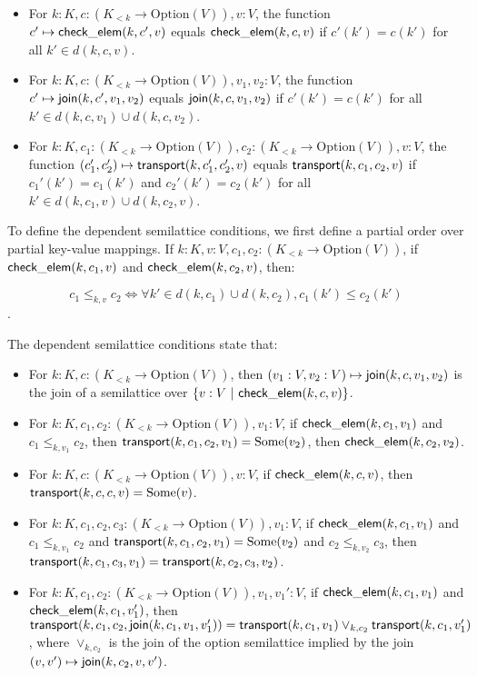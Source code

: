\documentclass{article}
\begin{document}
      \begin{itemize}
        \item For $k : K, c : (K_{<k} \to \mathrm{Option}(V)), v : V$, the function $c' \mapsto \mathsf{check\_elem}(k, c', v)$ equals $\mathsf{check\_elem}(k, c, v)$ if $c'(k') = c(k')$ for all $k' \in d(k, c, v)$.
        \item For $k : K, c : (K_{<k} \to \mathrm{Option}(V)), v_1, v_2 : V$, the function $c' \mapsto \mathsf{join}(k, c', v_1, v_2)$ equals $\mathsf{join}(k, c, v_1, v_2)$ if $c'(k') = c(k')$ for all $k' \in d(k, c, v_1) \cup d(k, c, v_2)$.
        \item For $k : K, c_1 : (K_{<k} \to \mathrm{Option}(V)), c_2 : (K_{<k} \to \mathrm{Option}(V)), v : V$, the function $(c_1', c_2') \mapsto \mathsf{transport}(k, c_1', c_2', v)$ equals $\mathsf{transport}(k, c_1, c_2, v)$ if $c_1'(k') = c_1(k')$ and $c_2'(k') = c_2(k')$ for all $k' \in d(k, c_1, v) \cup d(k, c_2, v)$.
      \end{itemize}

      To define the dependent semilattice conditions, we first define a partial order over partial key-value mappings. If $k : K, v : V, c_1, c_2 : (K_{<k} \to \mathrm{Option}(V))$, if $\mathsf{check\_elem}(k, c_1, v)$ and $\mathsf{check\_elem}(k, c_2, v)$, then:

      $$c_1 \leq_{k, v} c_2 \Leftrightarrow \forall k' \in d(k, c_1) \cup d(k, c_2), c_1(k') \leq c_2(k')$$.

      The dependent semilattice conditions state that:

      \begin{itemize}
        \item For $k : K, c : (K_{<k} \to \mathrm{Option}(V))$, then $(v_1 : V, v_2 : V) \mapsto \mathsf{join}(k, c, v_1, v_2)$ is the join of a semilattice over $\{ v : V ~ | ~ \mathsf{check\_elem}(k, c, v) \}$.
        \item For $k : K, c_1, c_2 : (K_{<k} \to \mathrm{Option}(V)), v_1 : V$, if $\mathsf{check\_elem}(k, c_1, v_1)$ and $c_1 \leq_{k, v_1} c_2$, then $\mathsf{transport}(k, c_1, c_2, v_1) = \mathrm{Some}(v_2)$, then $\mathsf{check\_elem}(k, c_2, v_2)$.
        \item For $k : K, c : (K_{<k} \to \mathrm{Option}(V)), v : V$, if $\mathsf{check\_elem}(k, c, v)$, then $\mathsf{transport}(k, c, c, v) = \mathrm{Some}(v)$.
        \item For $k : K, c_1, c_2, c_3 : (K_{<k} \to \mathrm{Option}(V)), v_1 : V$, if $\mathsf{check\_elem}(k, c_1, v_1)$ and $c_1 \leq_{k, v_1} c_2$ and $\mathsf{transport}(k, c_1, c_2, v_1) = \mathrm{Some}(v_2)$ and $c_2 \leq_{k, v_2} c_3$, then $\mathsf{transport}(k, c_1, c_3, v_1) = \mathsf{transport}(k, c_2, c_3, v_2)$.
        \item For $k : K, c_1, c_2 : (K_{<k} \to \mathrm{Option}(V)), v_1, v_1' : V$, if $\mathsf{check\_elem}(k, c_1, v_1)$ and $\mathsf{check\_elem}(k, c_1, v_1')$, then $\mathsf{transport}(k, c_1, c_2, \mathsf{join}(k, c_1, v_1, v_1')) = \mathsf{transport}(k, c_1, v_1) \vee_{k, c_2} \mathsf{transport}(k, c_1, v_1')$, where $\vee_{k, c_2}$ is the join of the option semilattice implied by the join $(v, v') \mapsto \mathsf{join}(k, c_2, v, v')$.
      \end{itemize}
\end{document}
